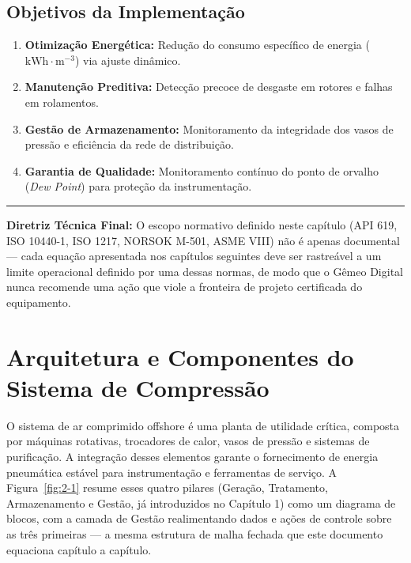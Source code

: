 \documentclass[12pt,a4paper]{article}
\numberwithin{equation}{section}
\numberwithin{table}{section}
\numberwithin{figure}{section}
\begin{document}
	\subsection{\textbf{Objetivos da Implementação}}
	\begin{enumerate}
		\item \textbf{Otimização Energética:} Redução do consumo específico de energia ($\text{kWh} \cdot \text{m}^{-3}$) via ajuste dinâmico.
		\item \textbf{Manutenção Preditiva:} Detecção precoce de desgaste em rotores e falhas em rolamentos.
		\item \textbf{Gestão de Armazenamento:} Monitoramento da integridade dos vasos de pressão e eficiência da rede de distribuição.
		\item \textbf{Garantia de Qualidade:} Monitoramento contínuo do ponto de orvalho (\textit{Dew Point}) para proteção da instrumentação.
	\end{enumerate}

	\vspace{1em}
	\hrule
	\vspace{1em}

	\textbf{Diretriz Técnica Final:} O escopo normativo definido neste capítulo (API 619, ISO 10440-1, ISO 1217, NORSOK M-501, ASME VIII) não é apenas documental — cada equação apresentada nos capítulos seguintes deve ser rastreável a um limite operacional definido por uma dessas normas, de modo que o Gêmeo Digital nunca recomende uma ação que viole a fronteira de projeto certificada do equipamento.

	
	\section{\textbf{Arquitetura e Componentes do Sistema de Compressão}}
	
	O sistema de ar comprimido offshore é uma planta de utilidade crítica, composta por máquinas rotativas, trocadores de calor, vasos de pressão e sistemas de purificação. A integração desses elementos garante o fornecimento de energia pneumática estável para instrumentação e ferramentas de serviço. A Figura~\ref{fig:2-1} resume esses quatro pilares (Geração, Tratamento, Armazenamento e Gestão, já introduzidos no Capítulo 1) como um diagrama de blocos, com a camada de Gestão realimentando dados e ações de controle sobre as três primeiras — a mesma estrutura de malha fechada que este documento equaciona capítulo a capítulo.
\end{document}
